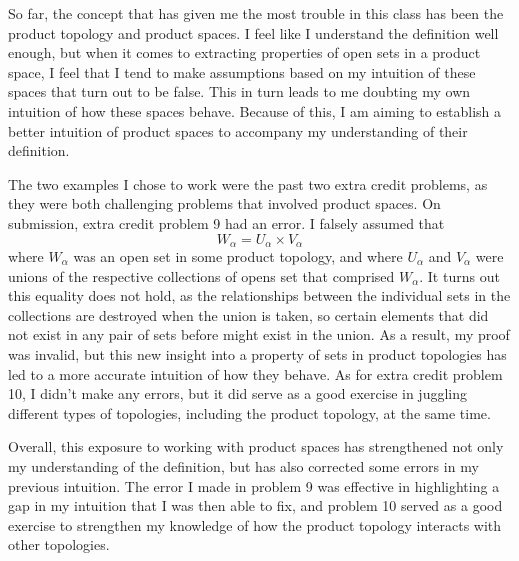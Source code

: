 \documentclass[12pt]{article}
\begin{document}
\pagestyle{fancy}
\fancyhead{}

\normalsize

So far, the concept that has given me the most trouble in this class has been
the product topology and product spaces.
I feel like I understand the definition well enough, but when it comes to
extracting properties of open sets in a product space, I feel that I tend to
make assumptions based on my intuition of these spaces that turn out to be
false.
This in turn leads to me doubting my own intuition of how these spaces behave.
Because of this, I am aiming to establish a better intuition of product spaces
to accompany my understanding of their definition.

The two examples I chose to work were the past two extra credit problems, as
they were both challenging problems that involved product spaces.
On submission, extra credit problem 9 had an error.
I falsely assumed that
\[W_\alpha = U_\alpha \times V_\alpha\]
where $W_\alpha$ was an open set in some product topology, and where
$U_\alpha$ and $V_\alpha$ were unions of the respective collections of opens
set that comprised $W_\alpha$.
It turns out this equality does not hold, as the relationships between the
individual sets in the collections are destroyed when the union is taken, so
certain elements that did not exist in any pair of sets before might exist in
the union.
As a result, my proof was invalid, but this new insight into a property of
sets in product topologies has led to a more accurate intuition of how they
behave.
As for extra credit problem 10, I didn't make any errors, but it did serve as
a good exercise in juggling different types of topologies, including the
product topology, at the same time.

Overall, this exposure to working with product spaces has strengthened not
only my understanding of the definition, but has also corrected some errors in
my previous intuition.
The error I made in problem 9 was effective in highlighting a gap in my
intuition that I was then able to fix, and problem 10 served as a good
exercise to strengthen my knowledge of how the product topology interacts with
other topologies.
\end{document}
